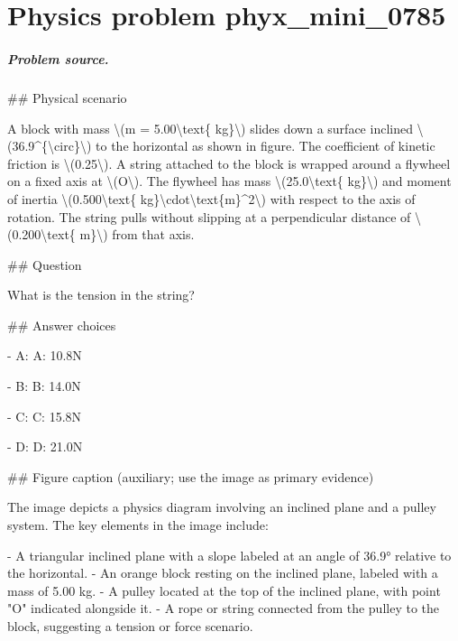 
\chapter{Physics problem phyx\_mini\_0785}
\label{ch:PhyXMiniProblems_problem_phyx_mini_0785}

\paragraph{Problem source.}
\#\# Physical scenario

A block with mass \textbackslash{}(m = 5.00\textbackslash{}text\{ kg\}\textbackslash{}) slides down a surface inclined \textbackslash{}(36.9\textasciicircum{}\{\textbackslash{}circ\}\textbackslash{}) to the horizontal as shown in figure. The coefficient of kinetic friction is \textbackslash{}(0.25\textbackslash{}). A string attached to the block is wrapped around a flywheel on a fixed axis at \textbackslash{}(O\textbackslash{}). The flywheel has mass \textbackslash{}(25.0\textbackslash{}text\{ kg\}\textbackslash{}) and moment of inertia \textbackslash{}(0.500\textbackslash{}text\{ kg\}\textbackslash{}cdot\textbackslash{}text\{m\}\textasciicircum{}2\textbackslash{}) with respect to the axis of rotation. The string pulls without slipping at a perpendicular distance of \textbackslash{}(0.200\textbackslash{}text\{ m\}\textbackslash{}) from that axis.

\#\# Question

What is the tension in the string?

\#\# Answer choices

- A: A: 10.8N

- B: B: 14.0N

- C: C: 15.8N

- D: D: 21.0N

\#\# Figure caption (auxiliary; use the image as primary evidence)

The image depicts a physics diagram involving an inclined plane and a pulley system. The key elements in the image include:

- A triangular inclined plane with a slope labeled at an angle of 36.9° relative to the horizontal.
- An orange block resting on the inclined plane, labeled with a mass of 5.00 kg.
- A pulley located at the top of the inclined plane, with point "O" indicated alongside it.
- A rope or string connected from the pulley to the block, suggesting a tension or force scenario.

